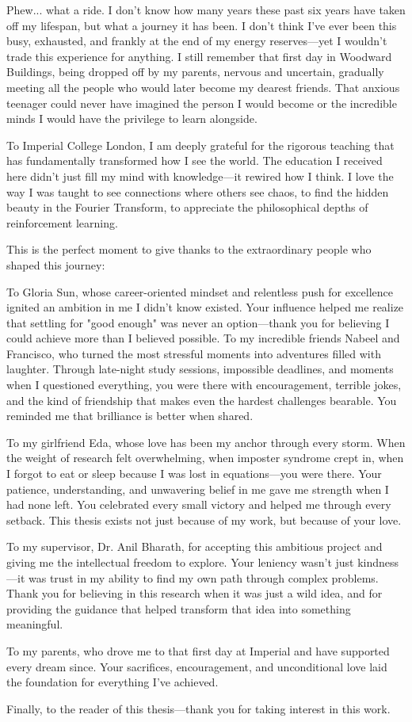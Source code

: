 
Phew... what a ride. I don't know how many years these past six years have taken off my lifespan, but what a journey it has been. I don't think I've ever been this busy, exhausted, and frankly at the end of my energy reserves—yet I wouldn't trade this experience for anything.
I still remember that first day in Woodward Buildings, being dropped off by my parents, nervous and uncertain, gradually meeting all the people who would later become my dearest friends. That anxious teenager could never have imagined the person I would become or the incredible minds I would have the privilege to learn alongside.

To Imperial College London, I am deeply grateful for the rigorous teaching that has fundamentally transformed how I see the world. The education I received here didn't just fill my mind with knowledge—it rewired how I think. I love the way I was taught to see connections where others see chaos, to find the hidden beauty in the Fourier Transform, to appreciate the philosophical depths of reinforcement learning.

This is the perfect moment to give thanks to the extraordinary people who shaped this journey:

To Gloria Sun, whose career-oriented mindset and relentless push for excellence ignited an ambition in me I didn't know existed. Your influence helped me realize that settling for "good enough" was never an option—thank you for believing I could achieve more than I believed possible.
To my incredible friends Nabeel and Francisco, who turned the most stressful moments into adventures filled with laughter. Through late-night study sessions, impossible deadlines, and moments when I questioned everything, you were there with encouragement, terrible jokes, and the kind of friendship that makes even the hardest challenges bearable. You reminded me that brilliance is better when shared.

To my girlfriend Eda, whose love has been my anchor through every storm. When the weight of research felt overwhelming, when imposter syndrome crept in, when I forgot to eat or sleep because I was lost in equations—you were there. Your patience, understanding, and unwavering belief in me gave me strength when I had none left. You celebrated every small victory and helped me through every setback. This thesis exists not just because of my work, but because of your love.

To my supervisor, Dr. Anil Bharath, for accepting this ambitious project and giving me the intellectual freedom to explore. Your leniency wasn't just kindness—it was trust in my ability to find my own path through complex problems. Thank you for believing in this research when it was just a wild idea, and for providing the guidance that helped transform that idea into something meaningful.

To my parents, who drove me to that first day at Imperial and have supported every dream since. Your sacrifices, encouragement, and unconditional love laid the foundation for everything I've achieved.

Finally, to the reader of this thesis—thank you for taking interest in this work. 
